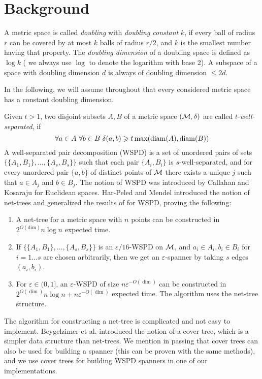 \documentclass[]{ws-ijcga}
\renewcommand{\leq}{\leqslant}
\renewcommand{\geq}{\geqslant}
\newcommand{\eps}{\varepsilon}
\begin{document}
\section{Background}
\label{sec:back}
%
A metric space is called \textit{doubling} with \textit{doubling constant} $k$,
if every ball of radius $r$ can be covered by at most $k$ balls of radius $r/2$,
and $k$ is the smallest number having that property.
The \textit{doubling dimension} of a doubling space is defined as $\log k$
(%
we always use $\log$ to denote the logarithm with base 2).
A subspace of a space with doubling dimension $d$ 
is always of doubling dimension $\leq 2d$.

In the following, we will assume throughout that every considered metric space
has a constant doubling dimension.

Given $t > 1$, two disjoint subsets $A, B$ of a metric space $(\mathcal{M}, \delta)$ are called $t$-\textit{well-separated},
if 
\[
\forall a \in A \,\, \forall b \in B \,\, \dist(a, b) \geq t \max(\diam(A), \diam(B))
\]
A well-separated pair decomposition (WSPD) is a set of unordered pairs of sets $\{ \{A_1, B_1 \}, 
\dots, \{A_s, B_s\} \}$ such that each pair $\{A_i, B_i\}$ is $s$-well-separated, and for every unordered pair $\{a, b\}$ 
of distinct points of $\mathcal{M}$ there exists a unique $j$ such that $a \in A_j$ and $b \in B_j$.
The notion of WSPD was introduced by Callahan and Kosaraju \cite{cal-kos-wspd} for Euclidean spaces.
Har-Peled and Mendel \cite{hm-fast} 
introduced the notion of net-trees and
generalized the results of \cite{cal-kos-wspd} for WSPD, proving the following:
\begin{enumerate}
    \item A net-tree for a metric space with $n$ points can be constructed in $2^{O(\mbox{dim})} n \log n$ expected time.
    \item If $\{ \{A_1, B_1 \}, 
\dots, \{A_s, B_s\} \}$ is an $\eps / 16$-WSPD on $\mathcal{M}$, and $a_i \in A_i, b_i \in B_i$ for $i = 1\dots s$
are chosen arbitrarily, then we get an $\eps$-spanner by taking $s$ edges $(a_i, b_i)$.
    \item For $\eps \in (0, 1]$,  an $\eps$-WSPD of size $n \eps^{-O({\dim})}$ can be constructed in $2^{O({\dim})} n \log n + n \eps ^{-O({\dim})}$ expected time. The algorithm uses the net-tree structure.
\end{enumerate}
The algorithm for constructing a net-tree is complicated and not easy to implement. Beygelzimer
et al. \cite{cover-trees} introduced the notion of a cover tree, which is a simpler data structure 
than net-trees. We mention in passing that cover trees can also be used for building
a spanner (this can be proven with the same methods), and we use cover trees for
building WSPD spanners in one of our implementations.
\end{document}
